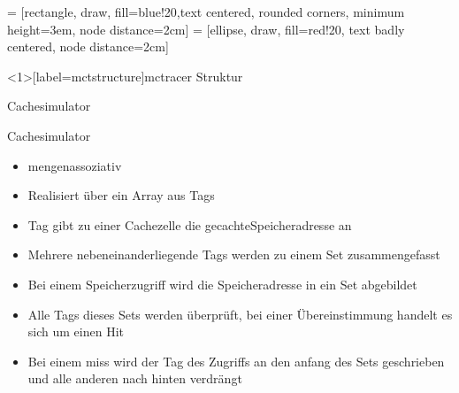 
 = [rectangle, draw, fill=blue!20,text centered, rounded corners, minimum height=3em, node distance=2cm]
 = [ellipse,   draw, fill=red!20, text badly centered, node distance=2cm]

\begin{frame}<1>[label=mctstructure]{mctracer Struktur}
\end{frame}

\begin{frame}{Cachesimulator}
	\begin{block}{Cachesimulator}
		\begin{itemize}[<+->]
			\item mengenassoziativ
			\item Realisiert über ein Array aus Tags
			\item Tag gibt zu einer Cachezelle die gecachteSpeicheradresse an
			\item Mehrere nebeneinanderliegende Tags werden zu einem Set zusammengefasst
			\item Bei einem Speicherzugriff wird die Speicheradresse in ein Set abgebildet
			\item Alle Tags dieses Sets werden überprüft, bei einer Übereinstimmung handelt es sich um einen Hit
			\item Bei einem miss wird der Tag des Zugriffs an den anfang des Sets geschrieben und alle anderen nach hinten verdrängt
		\end{itemize}
	\end{block}
\end{frame}

